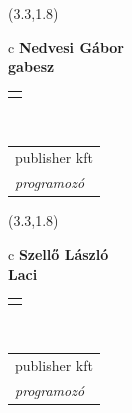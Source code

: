 \documentclass[11pt]{article}
\begin{document}
\makebox(3.3,1.8){
  \renewcommand\arraystretch{1.3}
  \begin{tabular}[c]{c}
    \hspace{8.5mm}
    \LARGE\bf{ Nedvesi Gábor }\\
    \hspace{8.5mm}
    \Large{ gabesz }\\
    \renewcommand\arraystretch{3}
    \begin{tabular}[c]{c}
      \centering
      \fontfamily{phv}\selectfont{
        \textbf{
          \textsc{
            \scriptsize{
            \color{Bright}{ Ismerkedő }\color{Bright}{ Webmester }\color{Bright}{ Sminkmester }\color{Bright}{ Programozó }
            }
          }
        }
      }
    \end{tabular}
    \\
    \renewcommand\arraystretch{1}
    \begin{tabular}{p{3.3in}}
      \hspace{.7cm}publisher kft\\
      \hspace{.7cm}\emph{ programozó }\\
    \end{tabular}
  \end{tabular}
}

\makebox(3.3,1.8){
  \renewcommand\arraystretch{1.3}
  \begin{tabular}[c]{c}
    \hspace{8.5mm}
    \LARGE\bf{ Szellő László }\\
    \hspace{8.5mm}
    \Large{ Laci }\\
    \renewcommand\arraystretch{3}
    \begin{tabular}[c]{c}
      \centering
      \fontfamily{phv}\selectfont{
        \textbf{
          \textsc{
            \scriptsize{
            \color{Dark}{ Ismerkedő }\color{Bright}{ Webmester }\color{Bright}{ Sminkmester }\color{Bright}{ Programozó }
            }
          }
        }
      }
    \end{tabular}
    \\
    \renewcommand\arraystretch{1}
    \begin{tabular}{p{3.3in}}
      \hspace{.7cm}publisher kft\\
      \hspace{.7cm}\emph{ programozó }\\
    \end{tabular}
  \end{tabular}
}
\end{document}

